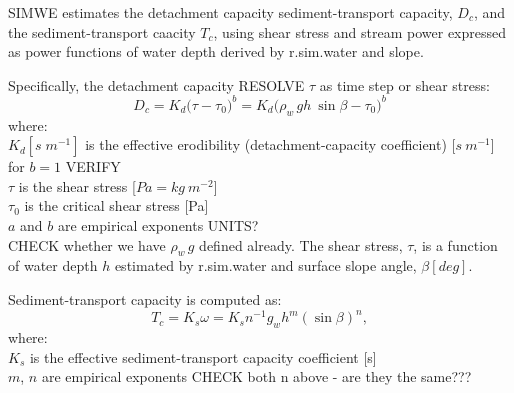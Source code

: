 \documentclass[gmd, manuscript]{copernicus}
\begin{document}
SIMWE estimates the detachment capacity sediment-transport capacity, $D_c $, and 
the sediment-transport caacity $T_c $, 
using shear stress and stream power \citep{Mitasova2001}
expressed as power functions of water depth derived by r.sim.water and slope. 

Specifically,  the detachment capacity RESOLVE $\tau$ as time step or shear stress:
\begin{equation}
\label{eq:detach_cap}
D_c =K_d  \bigl(\tau - \tau_0 \bigr)^b = K_d  \bigl(\rho_w\, g h~\sin \beta - \tau_0 \bigr)^b 
\end{equation}
{\small
\noindent
where: \\
\noindent
\hspace*{0.5em} $K_d  [s \; m^{-1}]$ is the effective erodibility (detachment-capacity coefficient) [$\unit{s~m^{-1}}$] for $b=1$ VERIFY\\
\hspace*{0.5em} $\tau$ is the shear stress [$\unit{Pa=kg~m^{-2}}$] \\
\hspace*{0.5em} $\tau_0$ is the critical shear stress [Pa] \\
\hspace*{0.5em} $a$ and $b$ are empirical exponents UNITS? \\
\hspace*{0.5em} CHECK whether we have $\rho_w\, g$ defined already.
}
The shear stress, $\tau $, is a function of water
depth $h$ estimated by r.sim.water and surface slope angle, $\beta [deg] $.

Sediment-transport capacity is computed as:
\smallskip
\begin{equation}
\label{eq:tc_streampower}
T_c =K_s \omega =
K_s n ^{-1} g_w h^{m} (\sin \beta)^{n}, 
\end{equation}
{\small
\noindent
where: \\
\noindent
\hspace*{0.5em} $K_s$ is the effective sediment-transport capacity coefficient [s] \\
\hspace*{0.5em} $m$, $n$ are empirical exponents CHECK both n above - are they the same???
}

\end{document}
